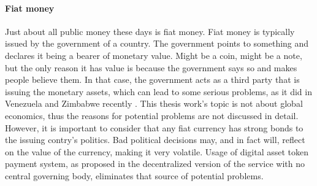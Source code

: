 \paragraph{Fiat money}
Just about all public money these days is fiat money. Fiat money is typically issued by the government of a country. The government points to something and declares it being a bearer of monetary value. Might be a coin, might be a note, but the only reason it has value is because the government says so and makes people believe them. In that case, the government acts as a third party that is issuing the monetary assets, which can lead to some serious problems, as it did in Venezuela and Zimbabwe recently \citep{venezimbab}. This thesis work's topic is not about global economics, thus the reasons for potential problems are not discussed in detail. However, it is important to consider that any fiat currency has strong bonds to the issuing contry's politics. Bad political decisions may, and in fact will, reflect on the value of the currency, making it very volatile. Usage of digital asset token payment system, as proposed in the decentralized version of the service with no central governing body, eliminates that source of potential problems.